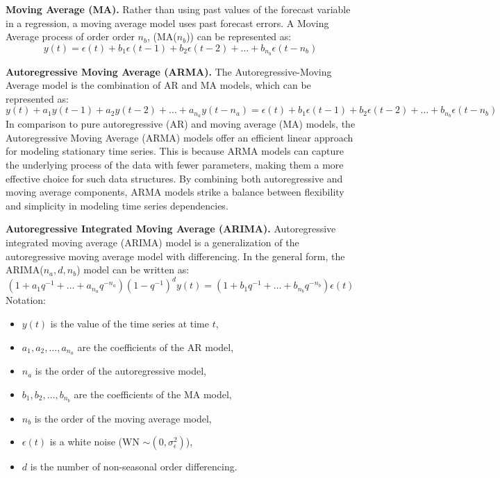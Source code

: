 \documentclass{scrartcl}
\begin{document}
\textbf{Moving Average (MA).}
Rather than using past values of the forecast variable in a
regression, a moving average model uses past forecast errors. A Moving Average process of order order \( n_b \), (MA(\( n_b \))) can be represented as:
\[
y(t) = \epsilon(t) + b_1 \epsilon(t-1) + b_2 \epsilon(t-2) + \dots + b_{n_b} \epsilon(t - n_b)
\]

\textbf{Autoregressive Moving Average (ARMA).}
The Autoregressive-Moving Average model is the combination of AR and MA models, which can be represented as:
\[
y(t) + a_1 y(t-1) + a_2 y(t-2) + \dots + a_{n_a} y(t-{n_a}) = \epsilon(t) + b_1 \epsilon(t-1) + b_2 \epsilon(t-2) + \dots + b_{n_b} \epsilon(t - n_b)
\]
In comparison to pure autoregressive (AR) and moving average (MA) models, the Autoregressive Moving Average (ARMA) models offer an efficient linear approach for modeling stationary time series. This is because ARMA models can capture the underlying process of the data with fewer parameters, making them a more effective choice for such data structures. By combining both autoregressive and moving average components, ARMA models strike a balance between flexibility and simplicity in modeling time series dependencies.

\textbf{Autoregressive Integrated Moving Average (ARIMA).}
Autoregressive integrated moving average (ARIMA) model is a generalization of the autoregressive moving average model with differencing. In the general form, the ARIMA(\(n_a, d, n_b\)) model can be written as:
$$
\left(1+a_1 q^{-1}+\dots+a_{n_a} q^{-n_a}\right)\left(1-q^{-1}\right)^d y(t) = \left(1+b_1 q^{-1}+\dots+b_{n_b} q^{-n_b}\right)\epsilon(t)$$
Notation:
\begin{itemize}
    \item \( y(t) \) is the value of the time series at time \( t \),
    \item \( a_1, a_2, \dots, a_{n_a} \) are the coefficients of the AR model,
    \item \( n_a \) is the order of the autoregressive model,
    \item \( b_1, b_2, \dots, b_{n_b} \) are the coefficients of the MA model,
    \item \( n_b \) is the order of the moving average model,
    \item \( \epsilon(t) \) is a white noise (WN $\sim (0, \sigma_\epsilon^2)$),
    \item \( d \) is the number of non-seasonal order differencing.
\end{itemize}
\end{document}
